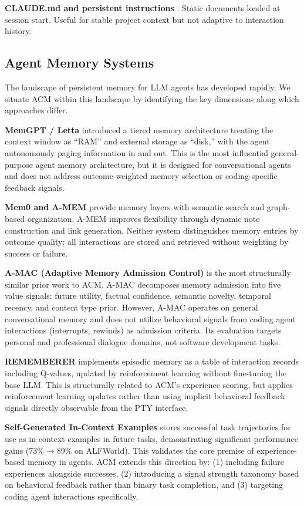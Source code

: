 \documentclass[conference]{IEEEtran}
\begin{document}
\textbf{CLAUDE.md and persistent instructions} \cite{Anthropic2025}: Static documents loaded at session start. Useful for stable project context but not adaptive to interaction history.

\subsection{Agent Memory Systems}

The landscape of persistent memory for LLM agents has developed rapidly. We situate ACM within this landscape by identifying the key dimensions along which approaches differ.

\textbf{MemGPT / Letta} \cite{Packer2023MemGPT} introduced a tiered memory architecture treating the context window as ``RAM'' and external storage as ``disk,'' with the agent autonomously paging information in and out. This is the most influential general-purpose agent memory architecture, but it is designed for conversational agents and does not address outcome-weighted memory selection or coding-specific feedback signals.

\textbf{Mem0 and A-MEM} \cite{Chhikara2025Mem0} provide memory layers with semantic search and graph-based organization. A-MEM \cite{Xu2025AMEM} improves flexibility through dynamic note construction and link generation. Neither system distinguishes memory entries by outcome quality; all interactions are stored and retrieved without weighting by success or failure.

\textbf{A-MAC (Adaptive Memory Admission Control)} \cite{Zhang2026AMAC} is the most structurally similar prior work to ACM. A-MAC decomposes memory admission into five value signals: future utility, factual confidence, semantic novelty, temporal recency, and content type prior. However, A-MAC operates on general conversational memory and does not utilize behavioral signals from coding agent interactions (interrupts, rewinds) as admission criteria. Its evaluation targets personal and professional dialogue domains, not software development tasks.

\textbf{REMEMBERER} \cite{Zhang2023REMEMBERER} implements episodic memory as a table of interaction records including Q-values, updated by reinforcement learning without fine-tuning the base LLM. This is structurally related to ACM's experience scoring, but applies reinforcement learning updates rather than using implicit behavioral feedback signals directly observable from the PTY interface.

\textbf{Self-Generated In-Context Examples} \cite{Sarukkai2025SelfGenICE} stores successful task trajectories for use as in-context examples in future tasks, demonstrating significant performance gains (73\%$\rightarrow$89\% on ALFWorld). This validates the core premise of experience-based memory in agents. ACM extends this direction by: (1) including failure experiences alongside successes, (2) introducing a signal strength taxonomy based on behavioral feedback rather than binary task completion, and (3) targeting coding agent interactions specifically.
\end{document}

